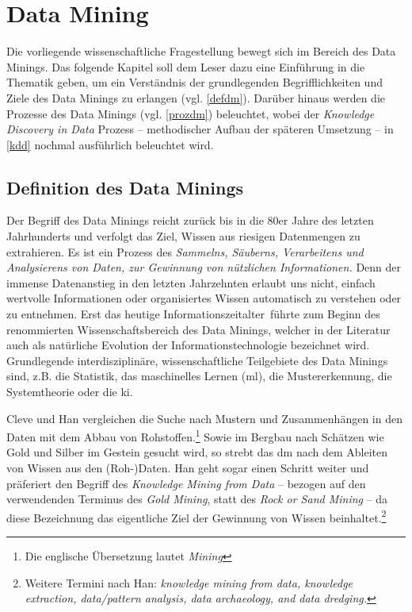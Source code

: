\section{Data Mining}
\label{dm}
Die vorliegende wissenschaftliche Fragestellung bewegt sich im Bereich des Data Minings. Das folgende Kapitel soll dem Leser dazu eine Einführung in die Thematik geben, um ein Verständnis der grundlegenden Begrifflichkeiten und Ziele des Data Minings zu erlangen (vgl. \vref{defdm}). Darüber hinaus werden die Prozesse des Data Minings (vgl. \vref{prozdm}) beleuchtet, wobei der \textit{Knowledge Discovery in Data} Prozess -- methodischer Aufbau der späteren Umsetzung -- in \vref{kdd} nochmal ausführlich beleuchtet wird.

\subsection{Definition des Data Minings}
\label{defdm}

Der Begriff des Data Minings reicht zurück bis in die 80er Jahre des letzten Jahrhunderts und verfolgt das Ziel, Wissen aus riesigen Datenmengen zu extrahieren. Es ist ein Prozess des \glqq  \textit{Sammelns, Säuberns, Verarbeitens und Analysierens von Daten, zur Gewinnung von nützlichen Informationen.}\grqq{} Denn der immense Datenanstieg in den letzten Jahrzehnten erlaubt uns nicht, einfach wertvolle Informationen oder organisiertes Wissen automatisch zu verstehen oder zu entnehmen. Erst das heutige \glqq Informationszeitalter\grqq~führte zum Beginn des renommierten Wissenschaftsbereich des Data Minings, welcher in der Literatur auch als natürliche Evolution der Informationstechnologie bezeichnet wird. Grundlegende interdisziplinäre, wissenschaftliche Teilgebiete des Data Minings sind, z.B. die Statistik, das maschinelles Lernen (\gls{ml}), die Mustererkennung, die Systemtheorie oder die \gls{ki}.


Cleve und Han vergleichen die Suche nach Mustern und Zusammenhängen in den Daten mit dem Abbau von Rohstoffen.\footnote{Die englische Übersetzung lautet \textit{\glqq Mining\grqq}} Sowie im Bergbau nach Schätzen wie Gold und Silber im Gestein gesucht wird, so strebt das \gls{dm} nach dem Ableiten von Wissen aus den (Roh-)Daten. Han geht sogar einen Schritt weiter und präferiert den Begriff des \textit{Knowledge Mining from Data} -- bezogen auf den verwendenden Terminus des \textit{Gold Mining}, statt des \textit{Rock or Sand Mining} -- da diese Bezeichnung das eigentliche Ziel der Gewinnung von Wissen beinhaltet.\footnote{Weitere Termini nach Han: \textit{knowledge mining from data, knowledge extraction, data/pattern analysis, data archaeology, and data dredging.}}

